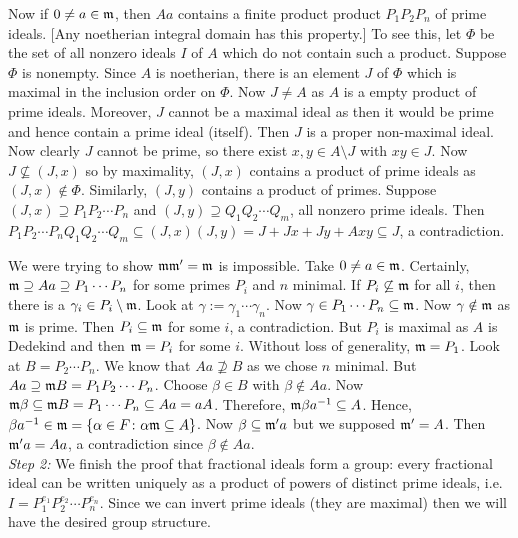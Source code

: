 Now if $0 \neq a \in \mathfrak{m}$, then $Aa$ contains a finite product product $P_1P_2 P_n$ of prime ideals. [Any noetherian integral domain has this property.] To see this, let $\Phi$ be the set of all nonzero ideals $I$ of $A$ which do not contain such a product. Suppose $\Phi$ is nonempty. Since $A$ is noetherian, there is an element $J$ of $\Phi$ which is maximal in the inclusion order on $\Phi$. Now $J \neq A$ as $A$ is a empty product of prime ideals. Moreover, $J$ cannot be a maximal ideal as then it would be prime and hence contain a prime ideal (itself). Then $J$ is a proper non-maximal ideal. Now clearly $J$ cannot be prime, so there exist $x,y \in A \setminus J$ with $xy \in J$. Now $J \not\subseteq (J,x)$ so by maximality, $(J,x)$ contains a product of prime ideals as $(J,x) \notin \Phi$. Similarly, $(J,y)$ contains a product of primes. Suppose $(J,x) \supseteq P_1P_2\cdots P_n$ and $(J,y) \supseteq Q_1Q_2\cdots Q_m$, all nonzero prime ideals. Then $P_1P_2 \cdots P_n Q_1 Q_2 \cdots Q_m \subseteq (J,x)(J,y)=J+Jx+Jy+Axy \subseteq J$, a contradiction. 


We were trying to show $\mathfrak{m}\mathfrak{m}'=\mathfrak{m}$ is impossible. Take $0\neq a \in \mathfrak{m}$. Certainly, $\mathfrak{m} \supseteq Aa \supseteq P_1\cdots P_n$ for some primes $P_i$ and $n$ minimal. If $P_i \not\subseteq \mathfrak{m}$ for all $i$, then there is a $\gamma_i \in P_i \setminus \mathfrak{m}$. Look at $\gamma:=\gamma_1 \cdots \gamma_n$. Now $\gamma \in P_1\cdots P_n \subseteq \mathfrak{m}$. Now $\gamma \notin \mathfrak{m}$ as $\mathfrak{m}$ is prime. Then $P_i \subseteq \mathfrak{m}$ for some $i$, a contradiction. But $P_i$ is maximal as $A$ is Dedekind and then $\mathfrak{m}=P_i$ for some $i$. Without loss of generality, $\mathfrak{m}=P_1$. Look at $B=P_2 \cdots P_n$. We know that $Aa \not\supseteq B$ as we chose $n$ minimal. But $Aa \supseteq \mathfrak{m} B=P_1P_2 \cdots P_n$. Choose $\beta \in B$ with $\beta \notin Aa$. Now $\mathfrak{m} \beta\subseteq \mathfrak{m} B = P_1\cdots P_n \subseteq Aa=aA$. Therefore, $\mathfrak{m} \beta a^{-1} \subseteq A$. Hence, $\beta a^{-1} \in \mathfrak{m}=\{\alpha \in F \colon \alpha \mathfrak{m} \subseteq A\}$. Now $\beta \subseteq \mathfrak{m}' a$ but we supposed $\mathfrak{m}'=A$. Then $\mathfrak{m}' a=Aa$, a contradiction since $\beta \notin Aa$. \\

\noindent \emph{Step 2:} We finish the proof that fractional ideals form a group: every fractional ideal can be written uniquely as a product of powers of distinct prime ideals, i.e. $I=P_1^{e_1} P_2^{e_2} \cdots P_n^{e_n}$. Since we can invert prime ideals (they are maximal) then we will have the desired group structure. \\

